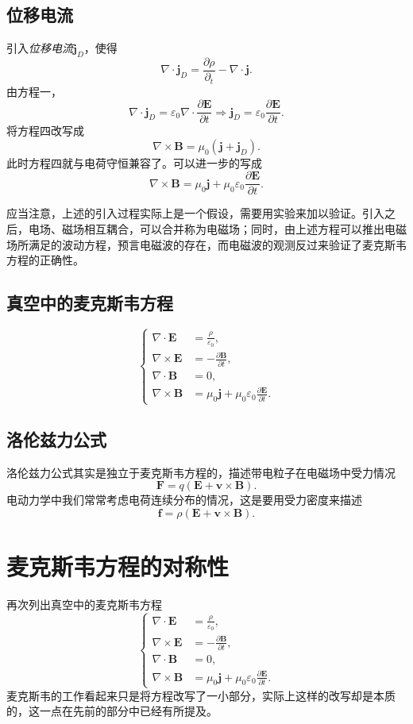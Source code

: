\documentclass[UTF8]{ctexbook}
\renewcommand{\b}{\boldsymbol}
\numberwithin{equation}{chapter}
\begin{document}
	\subsection{位移电流}
	引入\emph{位移电流}$\b{j}_D$，使得
	\[\nabla\cdot\b{j}_D=\frac{\partial \rho}{\partial _t}-\nabla\cdot\b{j}.\]
	由方程一，
	\[\nabla\cdot \b{j}_D=\varepsilon_0\nabla\cdot\frac{\partial \b{E}}{\partial t}\Rightarrow \b{j}_D=\varepsilon_0\frac{\partial \b{E}}{\partial t}.\]
	将方程四改写成
	\[\nabla\times\b{B}=\mu_0(\b{j}+\b{j}_D).\]
	此时方程四就与电荷守恒兼容了。可以进一步的写成
	\[\nabla\times\b{B}=\mu_0\b{j}+\mu_0\varepsilon_0\frac{\partial \b{E}}{\partial t}.\]
	
	应当注意，上述的引入过程实际上是一个假设，需要用实验来加以验证。引入之后，电场、磁场相互耦合，可以合并称为电磁场；同时，由上述方程可以推出电磁场所满足的波动方程，预言电磁波的存在，而电磁波的观测反过来验证了麦克斯韦方程的正确性。
	
	\subsection{真空中的麦克斯韦方程}
	\[\left\{\begin{aligned} 
		\nabla\cdot\b{E}&=\frac{\rho}{\varepsilon_0}, \\
		\nabla\times\b{E}&=-\frac{\partial \b{B}}{\partial t},\\ 
		\nabla\cdot\b{B}&=0,\\
		\nabla\times\b{B}&=\mu_0\b{j}+\mu_0\varepsilon_0\frac{\partial \b{E}}{\partial t}.\end{aligned}\right.\]
	
	\subsection{洛伦兹力公式}
	洛伦兹力公式其实是独立于麦克斯韦方程的，描述带电粒子在电磁场中受力情况
	\[\b{F}=q(\b{E}+\b{v}\times\b{B}).\]
	电动力学中我们常常考虑电荷连续分布的情况，这是要用受力密度来描述
	\[\b{f}=\rho(\b{E}+\b{v}\times\b{B}).\]
	
	\section{麦克斯韦方程的对称性}
	再次列出真空中的麦克斯韦方程
	\[\left\{\begin{aligned} 
		\nabla\cdot\b{E}&=\frac{\rho}{\varepsilon_0}, \\
		\nabla\times\b{E}&=-\frac{\partial \b{B}}{\partial t},\\ 
		\nabla\cdot\b{B}&=0,\\
		\nabla\times\b{B}&=\mu_0\b{j}+\mu_0\varepsilon_0\frac{\partial \b{E}}{\partial t}.\end{aligned}\right.\]
	麦克斯韦的工作看起来只是将方程改写了一小部分，实际上这样的改写却是本质的，这一点在先前的部分中已经有所提及。
	
\end{document}
